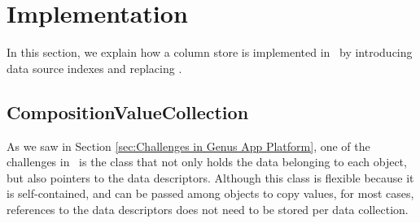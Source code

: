 \section{Implementation}
\label{sec:Implementation}

In this section, we explain how a column store is implemented in \gap~by introducing data source indexes and replacing .

\subsection{CompositionValueCollection}
\label{sub:CompositionValueCollection}
As we saw in Section \ref{sec:Challenges in Genus App Platform}, one of the challenges in \gap~is the  class that not only holds the data belonging to each object, but also pointers to the data descriptors. Although this class is flexible because it is self-contained, and can be passed among objects to copy values, for most cases, references to the data descriptors does not need to be stored per data collection. 

